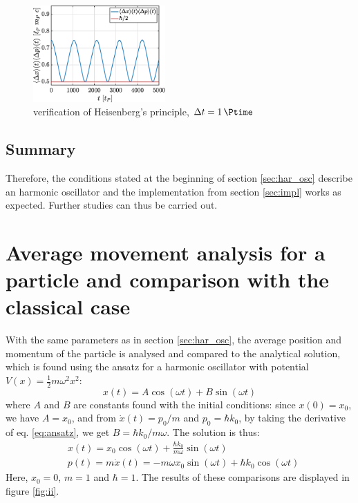 \documentclass[a4paper,12pt,twoside]{article}
\begin{document}
    \begin{figure}[h]
      \centering
      \includegraphics[width=0.45\textwidth]{graphs/i_heisenberg.eps}
      \caption{verification of Heisenberg's principle, $\Delta t = \SI{1}{\Ptime}$}
      \label{fig:i_heisenberg}
    \end{figure}

    \subsection{Summary}
    Therefore, the conditions stated at the beginning of section \ref{sec:har_osc} describe an harmonic oscillator and the implementation from section \ref{sec:impl} works as expected.
    Further studies can thus be carried out.


\newpage
\section{Average movement analysis for a particle and comparison with the classical case}

With the same parameters as in section \ref{sec:har_osc}, the average position and momentum of the particle is analysed and compared to the analytical solution, which is found using the ansatz for a harmonic oscillator with potential $V(x)=\frac{1}{2}m\omega^2x^2$:
\begin{equation}
 x(t)=A \cos(\omega t) + B \sin(\omega t)
 \label{eq:ansatz}
\end{equation}
where $A$ and $B$ are constants found with the initial conditions: since $x(0)=x_0$, we have $A=x_0$, and from $\dot{x}(t)=p_0/m$ and $p_0=\hbar k_0$, by taking the derivative of eq. \eqref{eq:ansatz}, we get $B=\hbar k_0/m\omega$. The solution is thus:
\begin{align}
 &x(t)=x_0\cos(\omega t) + \frac{\hbar k_0}{m \omega} \sin(\omega t)\\
 &p(t)=m\dot{x}(t)=-m\omega x_0\sin(\omega t) + \hbar k_0 \cos(\omega t)
\end{align}
Here, $x_0=0$, $m=1$ and $\hbar=1$. The results of these comparisons are displayed in figure \ref{fig:ii}.
\end{document}
